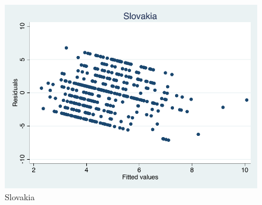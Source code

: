 \documentclass[12pt, titlepage]{article}
\begin{document}
\begin{figure}[H]
	\centering 
	\includegraphics[width=\textwidth]{Residuals/CountryIdeo/Slovakia}
	\caption{Slovakia}
	\label{Slovakia}
\end{figure}
\end{document}
